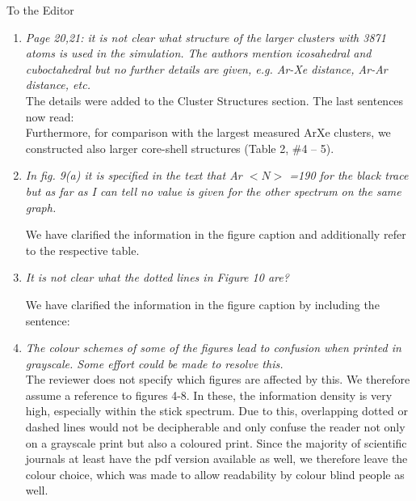 \documentclass[DIN,pagenumber=false,parskip=half,fromalign=left,fromphone=true,fromemail=true,fromurl=false,fromlogo=false,fromrule=false]{scrlttr2}
\begin{document}
\begin{letter}{To the Editor}
\begin{enumerate}
 \item \emph{Page 20,21:
       it is not clear what structure of the larger clusters with 3871 atoms is used in the simulation. The authors mention icosahedral and cuboctahedral but no further details are given, e.g. Ar-Xe distance, Ar-Ar distance, etc.}\\
       The details were added to the Cluster Structures section. The last
       sentences now read:\\
       Furthermore, for comparison with the largest measured ArXe clusters,
       we constructed also larger core-shell structures (Table 2, \#4 – 5).
       {}

 \item \emph{In fig. 9(a) it is specified in the text that  Ar $<N>$ =190 for the black trace but as far as I can tell no value is given for the other spectrum on the same graph.}

	We have clarified the information in the figure caption and additionally refer to the respective table.

 \item \emph{It is not clear what the dotted lines in Figure 10 are?}

 We have clarified the information in the figure caption by including the sentence: {\color{blue}{The dotted line shows the unscaled spectrum in this region.}}

 \item \emph{The colour schemes of some of the figures lead to confusion
             when printed in grayscale. Some effort could be made to
             resolve this.}\vspace{0.3cm}\\
       The reviewer does not specify which figures are affected by this.
       We therefore assume a reference to figures 4-8. In these, the
       information density is very high, especially within the stick spectrum.
       Due to this, overlapping dotted or dashed lines would not be
       decipherable and only confuse the reader not only on a grayscale print
       but also a coloured print. Since the majority of scientific journals
       at least have the pdf version available as well, we therefore leave
       the colour choice, which was made to allow readability by
       colour blind people as well.


\end{enumerate}
\end{letter}
\end{document}
